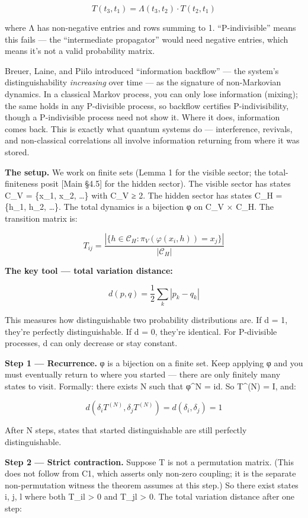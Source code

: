 \documentclass[
]{article}
\begin{document}
\[T(t_3, t_1) = \Lambda(t_3, t_2) \cdot T(t_2, t_1)\]

where Λ has non-negative entries and rows summing to 1.
``P-indivisible'' means this fails --- the ``intermediate propagator''
would need negative entries, which means it's not a valid probability
matrix.

Breuer, Laine, and Piilo introduced ``information backflow'' --- the
system's distinguishability \emph{increasing} over time --- as the
signature of non-Markovian dynamics. In a classical Markov process, you
can only lose information (mixing); the same holds in any P-divisible
process, so backflow certifies P-indivisibility, though a P-indivisible
process need not show it. Where it does, information comes back. This is
exactly what quantum systems do --- interference, revivals, and
non-classical correlations all involve information returning from where
it was stored.

\textbf{The setup.} We work on finite sets (Lemma 1 for the visible
sector; the total-finiteness posit {[}Main §4.5{]} for the hidden
sector). The visible sector has states C\_V = \{x\_1, x\_2, \ldots\}
with \textbar C\_V\textbar{} ≥ 2. The hidden sector has states C\_H =
\{h\_1, h\_2, \ldots\}. The total dynamics is a bijection φ on C\_V ×
C\_H. The transition matrix is:

\[T_{ij} = \frac{|\{h \in \mathcal{C}_H : \pi_V(\varphi(x_i, h)) = x_j\}|}{|\mathcal{C}_H|}\]

\textbf{The key tool --- total variation distance:}

\[d(p, q) = \frac{1}{2}\sum_k |p_k - q_k|\]

This measures how distinguishable two probability distributions are. If
d = 1, they're perfectly distinguishable. If d = 0, they're identical.
For P-divisible processes, d can only decrease or stay constant.

\textbf{Step 1 --- Recurrence.} φ is a bijection on a finite set. Keep
applying φ and you must eventually return to where you started --- there
are only finitely many states to visit. Formally: there exists N such
that φ\^{}N = id. So T\^{}(N) = I, and:

\[d(\delta_i T^{(N)}, \delta_j T^{(N)}) = d(\delta_i, \delta_j) = 1\]

After N steps, states that started distinguishable are still perfectly
distinguishable.

\textbf{Step 2 --- Strict contraction.} Suppose T is not a permutation
matrix. (This does not follow from C1, which asserts only non-zero
coupling; it is the separate non-permutation witness the theorem assumes
at this step.) So there exist states i, j, l where both T\_il
\textgreater{} 0 and T\_jl \textgreater{} 0. The total variation
distance after one step:
\end{document}
